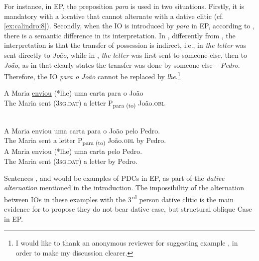 \documentclass[output=paper,colorlinks,citecolor=brown]{./langscibook}
\begin{document}
For instance, in EP, the preposition \textit{para} is used in two situations. Firstly, it is mandatory with a locative that cannot alternate with a dative clitic (cf. \ref{ex:calindro:8}). Secondly, when the IO is introduced by \textit{para} in EP, according to \citet{TorresMorais2007}, there is a semantic difference in its interpretation. In , differently from , the interpretation is that the transfer of possession is indirect, i.e., in  \textit{the letter} was sent directly to \textit{João}, while in , \textit{the letter} was first sent to someone else, then to \textit{João}, as in  that clearly states the transfer was done by someone else – \textit{Pedro}. Therefore, the IO \textit{para o João} cannot be replaced by \textit{lhe}.\footnote{I would like to thank an anonymous reviewer for suggesting example , in order to make my discussion clearer.}

\ea%
    \label{ex:calindro:12}
    \gll A Maria \underline{enviou} (*lhe) uma carta {para} {o}  {João}\\
    The Maria sent (\textsc{3sg.dat}) a letter P{\textsubscript{para (to)}} {} {João}.\textsc{obl}\\
    \glt ~\hfill \citep[96]{TorresMorais2007}
    \z

\ea%
    \label{ex:calindro:13}
    \ea\label{ex:calindro:13a}
    \gll A Maria     enviou   uma carta    para o João              pelo Pedro.\\
    The Maria  sent  a letter        P{\textsubscript{para (to)}} {} {João}.\textsc{obl} by Pedro.\\
    \ex\label{ex:calindro:13b}
    \gll A Maria    enviou (*lhe)  uma carta    pelo Pedro.\\
    The Maria  sent (\textsc{3sg.dat})     a letter         by Pedro.\\
    \glt
    \z
\z

Sentences ,  and  would be examples of PDCs in EP, as part of the \textit{dative alternation} mentioned in the introduction. The impossibility of the alternation between IOs in these examples with the 3\textsuperscript{rd} person dative clitic is the main evidence for \citet{TorresMorais2007} to propose they do not bear dative case, but structural oblique Case in EP.
\end{document}
